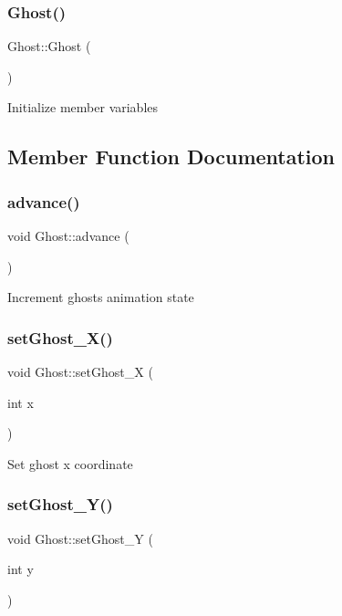 \subsubsection{\texorpdfstring{Ghost()}{Ghost()}}
{\footnotesize\ttfamily Ghost\+::\+Ghost (\begin{DoxyParamCaption}{ }\end{DoxyParamCaption})}

Initialize member variables 

\subsection{Member Function Documentation}
\mbox{\label{class_ghost_a0f15e38a34a0b2a4d6e05aa1f686210e}} 
\subsubsection{\texorpdfstring{advance()}{advance()}}
{\footnotesize\ttfamily void Ghost\+::advance (\begin{DoxyParamCaption}{ }\end{DoxyParamCaption})}

Increment ghost\textquotesingle{}s animation state \mbox{\label{class_ghost_abf91d6d8445cdf10291047fba33702c4}} 
\subsubsection{\texorpdfstring{set\+Ghost\+\_\+\+X()}{setGhost\_X()}}
{\footnotesize\ttfamily void Ghost\+::set\+Ghost\+\_\+X (\begin{DoxyParamCaption}\item[{int}]{x }\end{DoxyParamCaption})}

Set ghost x coordinate \mbox{\label{class_ghost_a670e6a5ae3a156b7833452375aedf0e3}} 
\subsubsection{\texorpdfstring{set\+Ghost\+\_\+\+Y()}{setGhost\_Y()}}
{\footnotesize\ttfamily void Ghost\+::set\+Ghost\+\_\+Y (\begin{DoxyParamCaption}\item[{int}]{y }\end{DoxyParamCaption})}


